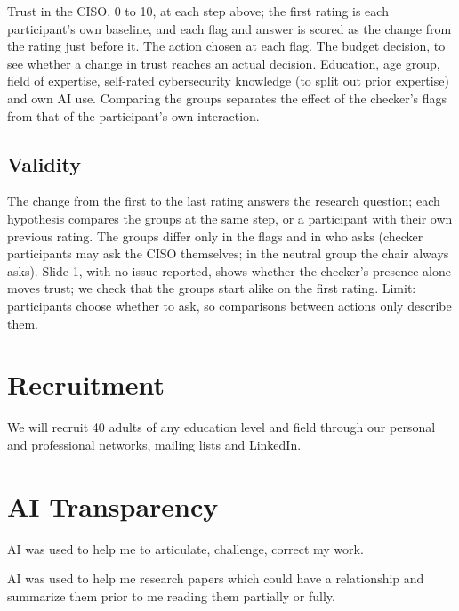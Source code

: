 \documentclass[stu, 12pt]{apa7}
\begin{document}
Trust in the CISO, 0 to 10, at each step above; the first rating is each participant's own baseline, and each flag and answer is scored as the change from the rating just before it. The action chosen at each flag. The budget decision, to see whether a change in trust reaches an actual decision. Education, age group, field of expertise, self-rated cybersecurity knowledge (to split out prior expertise) and own AI use. Comparing the groups separates the effect of the checker's flags from that of the participant's own interaction.

\subsection{Validity}

The change from the first to the last rating answers the research question; each hypothesis compares the groups at the same step, or a participant with their own previous rating. The groups differ only in the flags and in who asks (checker participants may ask the CISO themselves; in the neutral group the chair always asks). Slide 1, with no issue reported, shows whether the checker's presence alone moves trust; we check that the groups start alike on the first rating. Limit: participants choose whether to ask, so comparisons between actions only describe them.

\section{Recruitment}

We will recruit 40 adults of any education level and field through our personal and professional networks, mailing lists and LinkedIn.

\section{AI Transparency}

AI was used to help me to articulate, challenge, correct my work.

AI was used to help me research papers which could have a relationship and summarize them prior to me reading them partially or fully.

\clearpage
\printbibliography

\appendix
\end{document}
